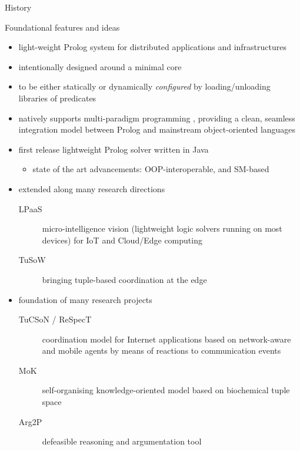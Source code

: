 \documentclass[handout]{beamer}
\begin{document}
\begin{frame}[allowframebreaks]{\tuprolog{} History}
\begin{block}{Foundational features and ideas}
	\begin{itemize}
		\item light-weight Prolog system for \alert{distributed} applications and infrastructures 
		\item intentionally designed around a \alert{minimal core}
		\item to be either statically or dynamically \emph{configured} by loading/unloading \alert{libraries} of predicates
		\item \tuprolog{} natively supports \alert{multi-paradigm programming} , providing a clean, seamless integration model between Prolog and mainstream object-oriented languages
	\end{itemize}
\end{block}

\framebreak

\begin{itemize}
	\item first release lightweight Prolog solver written in Java 
	\begin{itemize}
		\item state of the art advancements: OOP-interoperable, and SM-based 
	\end{itemize}
	\item extended along many research directions
	\begin{description}
		\item[LPaaS] micro-intelligence vision (lightweight logic solvers running on most devices) for IoT and Cloud/Edge computing 
		\item[TuSoW] bringing tuple-based coordination at the edge 
	\end{description}
	\item foundation of many research projects
	\begin{description}
		\item[TuCSoN / ReSpecT] coordination model for Internet applications based on network-aware and mobile agents  by means of reactions to communication events 
		\item[MoK] self-organising knowledge-oriented model based on biochemical tuple space 
		\item[Arg2P] defeasible reasoning and argumentation tool 
	\end{description}
\end{itemize}


\end{frame}
\end{document}
